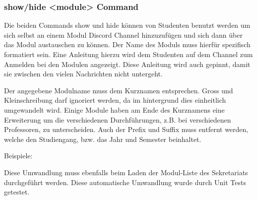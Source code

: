 \documentclass[a4paper, table]{article}
\begin{document}
\subsubsection{show/hide <module> Command}

Die beiden Commands show und hide können von Studenten benutzt werden um sich selbst an einem Modul Discord Channel hinzuzufügen und sich dann über das Modul austauschen zu können.
Der Name des Moduls muss hierfür spezifisch formatiert sein.
Eine Anleitung hierzu wird dem Studenten auf dem Channel zum Anmelden bei den Modulen angezeigt.
Diese Anleitung wird auch gepinnt, damit sie zwischen den vielen Nachrichten nicht untergeht.

Der angegebene Modulname muss dem Kurznamen entsprechen.
Gross und Kleinschreibung darf ignoriert werden, da im hintergrund dies einheitlich umgewandelt wird.
Einige Module haben am Ende des Kurznamens eine Erweiterung um die verschiedenen Durchführungen, z.B. bei verschiedenen Professoren, zu unterscheiden.
Auch der Prefix und Suffix muss entfernt werden, welche den Studiengang, bzw. das Jahr und Semester beinhaltet.

Beispiele:


Diese Umwandlung muss ebenfalls beim Laden der Modul-Liste des Sekretariats durchgeführt werden.
Diese automatische Umwandlung wurde durch Unit Tests getestet. 
\end{document}
